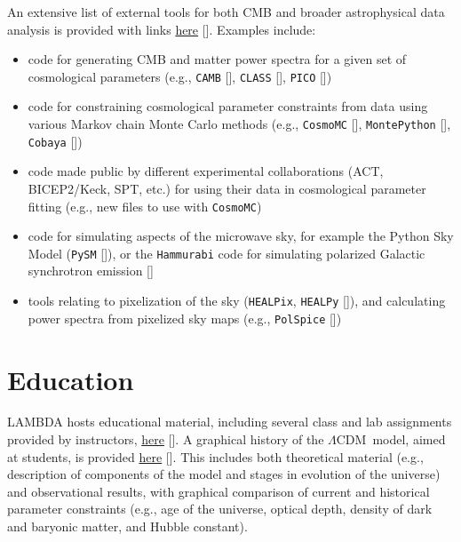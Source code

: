 \documentclass[twocolumn,tighten]{aastex631}
\newcommand{\lcdm}{\ensuremath{\Lambda\mathrm{CDM}}}
\begin{document}
An extensive list of external tools for both CMB and broader astrophysical data analysis is provided with links \href{https://lambda.gsfc.nasa.gov/toolbox/}{here} []. Examples include:
\begin{itemize}
    \item code for generating CMB and matter power spectra for a given set of cosmological parameters (e.g., \texttt{CAMB} [], \texttt{CLASS} [], \texttt{PICO} [])
    \item code for constraining cosmological parameter constraints from data using various Markov chain Monte Carlo methods (e.g., \texttt{CosmoMC} [], \texttt{MontePython} [], \texttt{Cobaya} [])
    \item code made public by different experimental collaborations (ACT, BICEP2/Keck, SPT, etc.) for using their data in cosmological parameter fitting (e.g., new files to use with \texttt{CosmoMC})
    \item code for simulating aspects of the microwave sky, for example the Python Sky Model (\texttt{PySM} []), or the \texttt{Hammurabi} code for simulating polarized Galactic synchrotron emission []
    \item tools relating to pixelization of the sky (\texttt{HEALPix}, \texttt{HEALPy} []), and calculating power spectra from pixelized sky maps (e.g., \texttt{PolSpice} [])
\end{itemize}

\section{Education}

LAMBDA hosts educational material, including several class and lab assignments provided by instructors, \href{https://lambda.gsfc.nasa.gov/education/}{here} []. A graphical history of the \lcdm\ model, aimed at students, is provided \href{https://lambda.gsfc.nasa.gov/education/graphic_history/}{here} []. This includes both theoretical material (e.g., description of components of the model and stages in evolution of the universe) and observational results, with graphical comparison of current and historical parameter constraints (e.g., age of the universe, optical depth, density of dark and baryonic matter, and Hubble constant).
\end{document}
